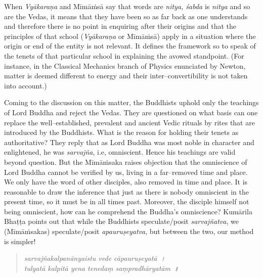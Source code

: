 When \textit{Vyākaraṇa} and Mīmāṁsā say that words are \textit{nitya, śabda} is \textit{nitya} and so are the Vedas, it means that they have been so as far back as one understands and therefore there is no point in enquiring after their origins and that the principles of that school (\textit{Vyākaraṇa} or Mīmāṁsā) apply in a situation where the origin or end of the entity is not relevant. It defines the framework so to speak of the tenets of that particular school in explaining the avowed standpoint. (For instance, in the Classical Mechanics branch of Physics enunciated by Newton, matter is deemed different to energy and their inter–convertibility is not taken into account.)

Coming to the discussion on this matter, the Buddhists uphold only the teachings of Lord Buddha and reject the Vedas. They are questioned on what basis can one replace the well–established, prevalent and ancient Vedic rituals by rites that are introduced by the Buddhists. What is the reason for holding their tenets as authoritative? They reply that as Lord Buddha was most noble in character and enlightened, he was \textit{sarvajña}, i.e, omniscient. Hence his teachings are valid beyond question. But the Mīmāṁsaka raises objection that the omniscience of Lord Buddha cannot be verified by us, living in a far–removed time and place. We only have the word of other disciples, also removed in time and place. It is reasonable to draw the inference that just as there is nobody omniscient in the present time, so it must be in all times past. Moreover, the disciple himself not being omniscient, how can he comprehend the Buddha’s omniscience? Kumārila Bhaṭṭa points out that while the Buddhists speculate/posit \textit{sarvajñatva}, we (Mīmāṁsakas) speculate/posit \textit{apauruṣeyatva}, but between the two, our method is simpler!

\begin{verse}
\textit{sarvajñakalpanānyaistu vede cāpauruṣeyatā~।}\\\textit{tulyatā kalpitā yena tenedaṃ saṃpradhāryatām~॥} 
\end{verse}


